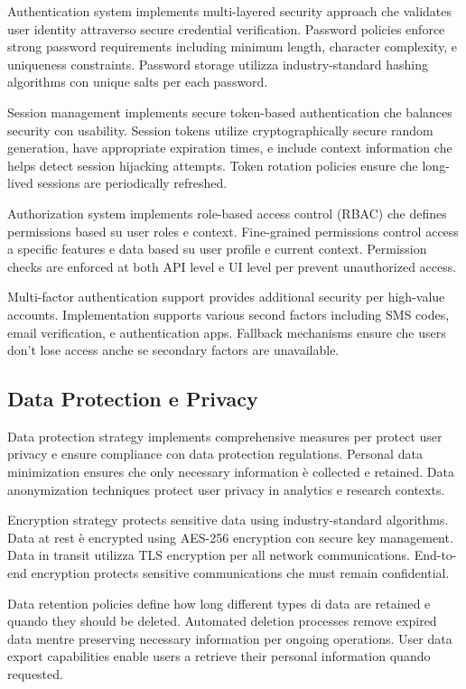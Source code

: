 \documentclass[12pt,a4paper]{article}
\begin{document}
Authentication system implements multi-layered security approach che validates user identity attraverso secure credential verification. Password policies enforce strong password requirements including minimum length, character complexity, e uniqueness constraints. Password storage utilizza industry-standard hashing algorithms con unique salts per each password.

Session management implements secure token-based authentication che balances security con usability. Session tokens utilize cryptographically secure random generation, have appropriate expiration times, e include context information che helps detect session hijacking attempts. Token rotation policies ensure che long-lived sessions are periodically refreshed.

Authorization system implements role-based access control (RBAC) che defines permissions based su user roles e context. Fine-grained permissions control access a specific features e data based su user profile e current context. Permission checks are enforced at both API level e UI level per prevent unauthorized access.

Multi-factor authentication support provides additional security per high-value accounts. Implementation supports various second factors including SMS codes, email verification, e authentication apps. Fallback mechanisms ensure che users don't lose access anche se secondary factors are unavailable.

\subsection{Data Protection e Privacy}

Data protection strategy implements comprehensive measures per protect user privacy e ensure compliance con data protection regulations. Personal data minimization ensures che only necessary information è collected e retained. Data anonymization techniques protect user privacy in analytics e research contexts.

Encryption strategy protects sensitive data using industry-standard algorithms. Data at rest è encrypted using AES-256 encryption con secure key management. Data in transit utilizza TLS encryption per all network communications. End-to-end encryption protects sensitive communications che must remain confidential.

Data retention policies define how long different types di data are retained e quando they should be deleted. Automated deletion processes remove expired data mentre preserving necessary information per ongoing operations. User data export capabilities enable users a retrieve their personal information quando requested.
\end{document}
